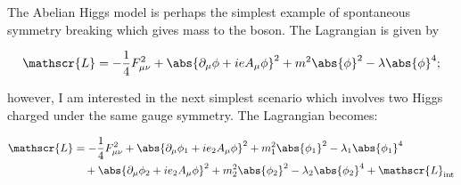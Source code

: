 The Abelian Higgs model is perhaps the simplest example of spontaneous symmetry
breaking which gives mass to the boson.  The Lagrangian is given by

\begin{equation}
  \mathscr{L} = - \frac{1}{4} F_{\mu\nu}^{2} + \abs{\partial_{\mu} \phi + i e A_{\mu} \phi}^{2} + m^{2} \abs{\phi}^2 - \lambda \abs{\phi}^{4};
\end{equation}

however, I am interested in the next simplest scenario which involves two Higgs
charged under the same gauge symmetry.  The Lagrangian becomes:

\begin{align}
\mathscr{L} &= - \frac{1}{4} F_{\mu\nu}^{2} + \abs{\partial_{\mu} \phi_{1} + i e_{2} A_{\mu} \phi}^{2} + m_{1}^{2} \abs{\phi_{1}}^2 - \lambda_{1} \abs{\phi_{1}}^{4} \\
            &\quad + \abs{\partial_{\mu} \phi_{2} + i e_{2} A_{\mu} \phi}^{2} + m_{2}^{2} \abs{\phi_{2}}^2 - \lambda_{2} \abs{\phi_{2}}^{4} + \mathscr{L}_{\text{int}}
\end{align}